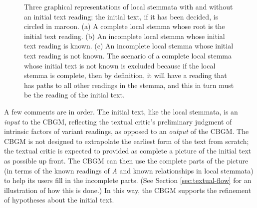 \documentclass[a4paper, 12pt]{article}
\begin{document}
\begin{figure}[h!]
\begin{tabular}{ccc}
		\end{tabular}
		\caption{Three graphical representations of local stemmata with and without an initial text reading; the initial text, if it has been decided, is circled in maroon. (a) A complete local stemma whose root is the initial text reading. (b) An incomplete local stemma whose initial text reading is known. (c) An incomplete local stemma whose initial text reading is not known. The scenario of a complete local stemma whose initial text is not known is excluded because if the local stemma is complete, then by definition, it will have a reading that has paths to all other readings in the stemma, and this in turn must be the reading of the initial text.}
		\label{fig:initial-text}
	\end{figure}
	
	A few comments are in order. The initial text, like the local stemmata, is an \emph{input} to the CBGM, reflecting the textual critic's preliminary judgment of intrinsic factors of variant readings, as opposed to an \emph{output} of the CBGM. The CBGM is not designed to extrapolate the earliest form of the text from scratch; the textual critic is expected to provided as complete a picture of the initial text as possible up front. The CBGM can then use the complete parts of the picture (in terms of the known readings of \emph{A} and known relationships in local stemmata) to help its users fill in the incomplete parts. (See Section \ref{sec:textual-flow} for an illustration of how this is done.) In this way, the CBGM supports the refinement of hypotheses about the initial text.
	
	\newpage
	
\end{document}
